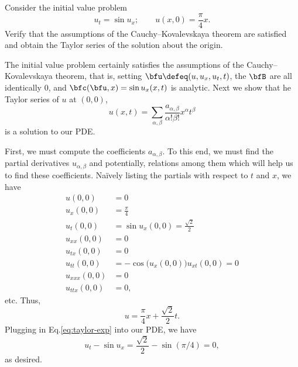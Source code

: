 \begin{problem}
  Consider the initial value problem
  \[
    u_t=\sin u_x;\qquad u(x,0)=\frac{\pi}{4}x.
  \]
  Verify that the assumptions of the Cauchy--Kovalevskaya theorem are
  satisfied and obtain the Taylor series of the solution about the origin.
\end{problem}
\begin{solution}
  The initial value problem certainly satisfies the assumptions of the
  Cauchy--Kovalevskaya theorem, that is, setting
  \(\bfu\defeq(u,u_x,u_t,t)\), the \(\bfB\) are all identically \(0\), and
  \(\bfc(\bfu,x)=\sin u_x(x,t)\) is analytic. Next we show that he Taylor
  series of \(u\) at \((0,0)\),
  \[
    u(x,t)=\sum_{\alpha,\beta} \frac{a_{\alpha,\beta}}{\alpha!\beta!}
    x^\alpha t^\beta
  \]
  is a solution to our PDE.

  First, we must compute the coefficients \(a_{\alpha,\beta}\). To this
  end, we must find the partial derivatives \(u_{\alpha,\beta}\) and
  potentially, relations among them which will help us to find these
  coefficients. Naïvely listing the partials with respect to \(t\) and
  \(x\), we have
  \begin{align*}
    u(0,0)&=0\\
    u_x(0,0)&=\frac{\pi}{4}\\
    u_t(0,0)&=\sin u_x(0,0)=\frac{\sqrt{2}}{2}\\
    u_{xx}(0,0)&=0\\
    u_{tx}(0,0)&=0\\
    u_{tt}(0,0)&=-\cos\bigl(u_x(0,0)\bigr)u_{xt}(0,0)=0\\
    u_{xxx}(0,0)&=0\\
    u_{ttx}(0,0)&=0,
  \end{align*}
  etc. Thus,
  \begin{equation}
    \label{eq:taylor-exp}
    u=\frac{\pi}{4}x+\frac{\sqrt{2}}{2}t.
  \end{equation}
  Plugging in Eq.\@ \eqref{eq:taylor-exp} into our PDE, we have
  \[
    u_t-\sin u_x=\frac{\sqrt{2}}{2}-\sin(\pi/4)=0,
  \]
  as desired.
\end{solution}
\newpage

